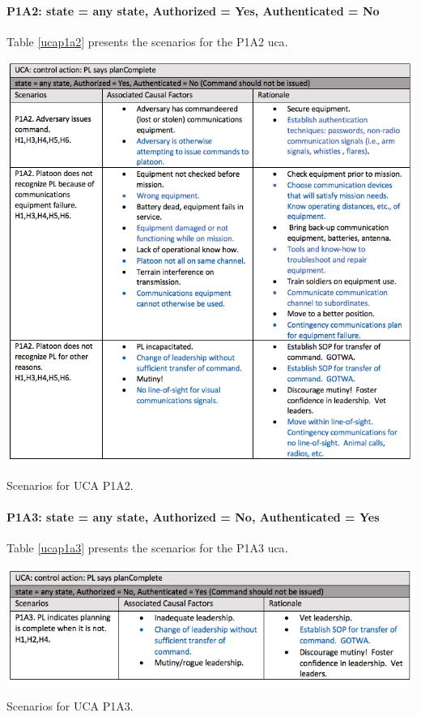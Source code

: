 \documentclass[../../main/main.tex]{subfiles}
\begin{document}
\paragraph*{P1A2: state  = any state, Authorized = Yes, Authenticated = No}
Table \ref{ucap1a2} presents the scenarios for the P1A2 \gls{uca}.

\begin{table}[ht!]
\begin{center}
\includegraphics[width=\linewidth]{../figures/ucap1a2}
\caption{Scenarios for UCA P1A2.}
\label{ucap1a2}
\end{center}
\end{table}

\clearpage
\paragraph*{P1A3: state  = any state, Authorized = No, Authenticated = Yes}
Table \ref{ucap1a3} presents the scenarios for the P1A3 \gls{uca}.

\begin{table}[ht!]
\begin{center}
\includegraphics[width=\linewidth]{../figures/ucap1a3}
\caption{Scenarios for UCA P1A3.}
\label{ucap1a3}
\end{center}
\end{table}
\end{document}
